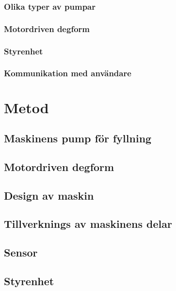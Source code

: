 \documentclass[11pt,a4paper,oneside]{book}
\begin{document}
\subsection{Olika typer av pumpar}
 
\subsection{Motordriven degform}

\subsection{Styrenhet}

\subsection{Kommunikation med användare}


\chapter{Metod}

\section{Maskinens pump för fyllning}

\section{Motordriven degform}

\section{Design av maskin}

\section{Tillverknings av maskinens delar}

\section{Sensor}

\section{Styrenhet}

\end{document}
